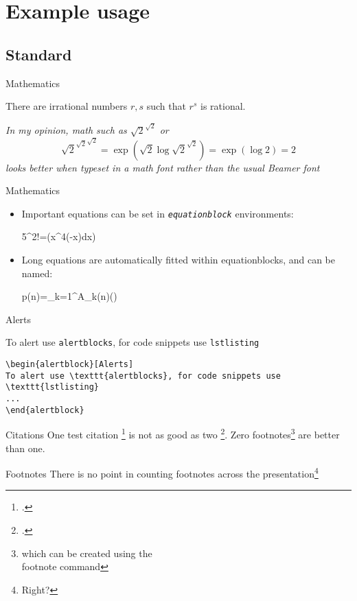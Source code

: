 \documentclass[12pt]{beamer}
\begin{document}
\section{Example usage}
\subsection{Standard}
\begin{frame}{Mathematics}
\begin{theorem}
There are irrational numbers $r,s$ such that $r^s$ is rational.
\end{theorem}
\textit{In my opinion, math such as $\sqrt{2}^{\sqrt{2}}$ or 
 $$
 {\sqrt{2}^{\sqrt{2}}}^{\sqrt{2}}=\exp(\sqrt{2}\log\sqrt{2}^{\sqrt{2}})=\exp(\log{2})=2
 $$ looks better when typeset in a math font rather than the usual Beamer font}\hfill\qedsymbol

\end{frame}
\begin{frame}{Mathematics}
\begin{itemize}
	\item Important equations can be set in \emph{\texttt{equationblock}} environments:
	\begin{equationblock}
		5^2!=\exp\left(\int x^4\exp(-x)\;dx\right)
	\end{equationblock}	
	\item Long equations are automatically fitted within equationblocks, and can be named:
	\begin{equationblock}
		p(n)=\sum_{k=1}^{\infty}A_{k}(n)\left(\sinh{}\right)
	\end{equationblock}
\end{itemize}
\end{frame}
\begin{frame}[fragile]{Alerts}
\begin{alertblock}[Alerts]
To alert use \texttt{alertblocks}, for code snippets use \texttt{lstlisting}
\begin{lstlisting}
\begin{alertblock}[Alerts]
To alert use \texttt{alertblocks}, for code snippets use \texttt{lstlisting}
...
\end{alertblock}
\end{lstlisting}

\end{alertblock}
\end{frame}
\begin{frame}{Citations}
One test citation \footcite{AdamsFournier2003} is not as good as two \footcite{AlexanderianPetraStadlerEtAl2016}. 
Zero footnotes\footnote{which can be created using the \\footnote command} are better than one.
\end{frame}
\begin{frame}{Footnotes}
	There is no point in counting footnotes across the presentation\footnote{Right?}
\end{frame}
	
\end{document}
